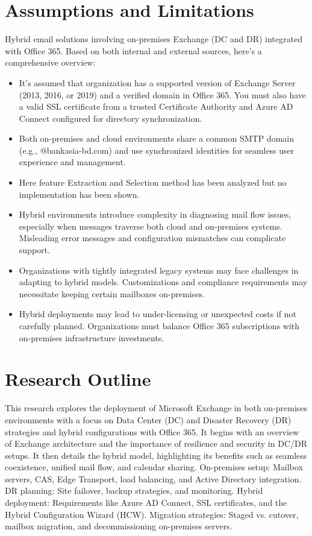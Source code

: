 \section{Assumptions and Limitations}
Hybrid email solutions involving on-premises Exchange (DC and DR) integrated with Office 365. Based on both internal and external sources, here's a comprehensive overview:
\begin{itemize}
    \item It's assumed that  organization has a supported version of Exchange Server (2013, 2016, or 2019) and a verified domain in Office 365. You must also have a valid SSL certificate from a trusted Certificate Authority and Azure AD Connect configured for directory synchronization.
    \item Both on-premises and cloud environments share a common SMTP domain (e.g., @bankasia-bd.com) and use synchronized identities for seamless user experience and management.
    \item Here feature Extraction and Selection method has been analyzed but no implementation has been shown.
    \item Hybrid environments introduce complexity in diagnosing mail flow issues, especially when messages traverse both cloud and on-premises systems. Misleading error messages and configuration mismatches can complicate support. 
    \item Organizations with tightly integrated legacy systems may face challenges in adapting to hybrid models. Customizations and compliance requirements may necessitate keeping certain mailboxes on-premises.
    \item Hybrid deployments may lead to under-licensing or unexpected costs if not carefully planned. Organizations must balance Office 365 subscriptions with on-premises infrastructure investments.
\end{itemize}

\section{Research Outline}
This research explores the deployment of Microsoft Exchange in both on-premises environments with a focus on Data Center (DC) and Disaster Recovery (DR) strategies and hybrid configurations with Office 365. It begins with an overview of Exchange architecture and the importance of resilience and security in DC/DR setups. It then details the hybrid model, highlighting its benefits such as seamless coexistence, unified mail flow, and calendar sharing.
On-premises setup: Mailbox servers, CAS, Edge Transport, load balancing, and Active Directory integration.
DR planning: Site failover, backup strategies, and monitoring.
Hybrid deployment: Requirements like Azure AD Connect, SSL certificates, and the Hybrid Configuration Wizard (HCW).
Migration strategies: Staged vs. cutover, mailbox migration, and decommissioning on-premises servers.


